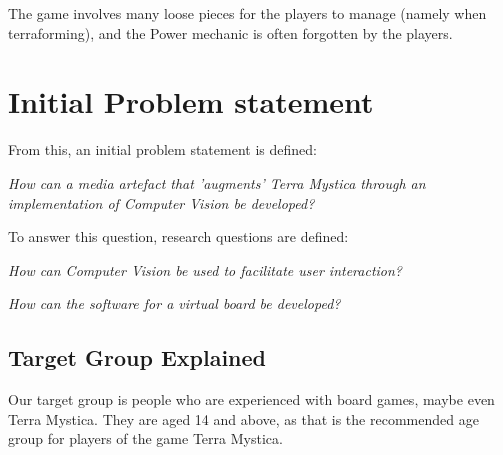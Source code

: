 The game involves many loose pieces for the players to manage (namely when terraforming), and the Power mechanic is often forgotten by the players.

\section{Initial Problem statement}
From this, an initial problem statement is defined: 

\textit{How can a media artefact that 'augments' Terra Mystica through an implementation of Computer Vision be developed?}

To answer this question, research questions are defined:

\textit{How can Computer Vision be used to facilitate user interaction?}

\textit{How can the software for a virtual board be developed?}

\subsection{Target Group Explained}
 Our target group is people who are experienced with board games, maybe even Terra Mystica. They are aged 14 and above, as that is the recommended age group for players of the game Terra Mystica.